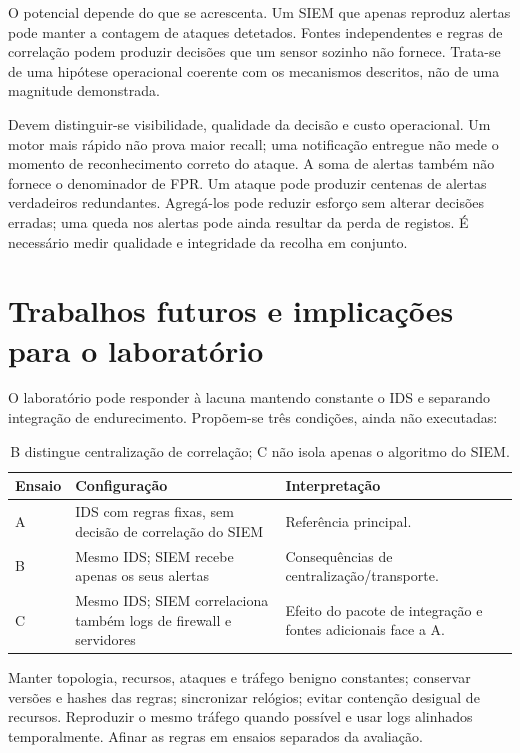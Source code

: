 \documentclass[11pt,a4paper]{article}
\begin{document}
O potencial depende do que se acrescenta. Um SIEM que apenas reproduz alertas pode manter a contagem de ataques detetados. Fontes independentes e regras de correlação podem produzir decisões que um sensor sozinho não fornece. Trata-se de uma hipótese operacional coerente com os mecanismos descritos, não de uma magnitude demonstrada.

Devem distinguir-se visibilidade, qualidade da decisão e custo operacional. Um motor mais rápido não prova maior recall; uma notificação entregue não mede o momento de reconhecimento correto do ataque. A soma de alertas também não fornece o denominador de FPR. Um ataque pode produzir centenas de alertas verdadeiros redundantes. Agregá-los pode reduzir esforço sem alterar decisões erradas; uma queda nos alertas pode ainda resultar da perda de registos. É necessário medir qualidade e integridade da recolha em conjunto.

\section{Trabalhos futuros e implicações para o laboratório}
O laboratório pode responder à lacuna mantendo constante o IDS e separando integração de endurecimento. Propõem-se três condições, ainda não executadas:
\begin{table}[H]\centering\small
\begin{tabularx}{\linewidth}{@{}P{1.3cm}Y Y@{}}\toprule
Ensaio & Configuração & Interpretação\\\midrule
A & IDS com regras fixas, sem decisão de correlação do SIEM & Referência principal.\\
B & Mesmo IDS; SIEM recebe apenas os seus alertas & Consequências de centralização/transporte.\\
C & Mesmo IDS; SIEM correlaciona também logs de firewall e servidores & Efeito do pacote de integração e fontes adicionais face a A.\\\bottomrule
\end{tabularx}\caption{B distingue centralização de correlação; C não isola apenas o algoritmo do SIEM.}\end{table}

Manter topologia, recursos, ataques e tráfego benigno constantes; conservar versões e hashes das regras; sincronizar relógios; evitar contenção desigual de recursos. Reproduzir o mesmo tráfego quando possível e usar logs alinhados temporalmente. Afinar as regras em ensaios separados da avaliação.
\end{document}
